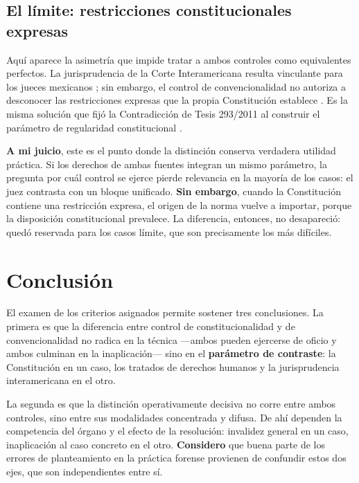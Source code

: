 \documentclass[
  spanish,
  letterpaper, oneside
]{article}
\begin{document}
\subsection{El límite: restricciones constitucionales expresas}

Aquí aparece la asimetría que impide tratar a ambos controles como equivalentes
perfectos. La jurisprudencia de la Corte Interamericana resulta vinculante para los
jueces mexicanos \citep{scjnTesis2005942}; sin embargo, el control de
convencionalidad no autoriza a desconocer las restricciones expresas que la propia
Constitución establece \citep{scjnTesis2006165}. Es la misma solución que fijó la
Contradicción de Tesis 293/2011 al construir el parámetro de regularidad
constitucional \citep{scjnTesis2006224, scjnIijCT293y2017}.

\textbf{A mi juicio}, este es el punto donde la distinción conserva verdadera
utilidad práctica. Si los derechos de ambas fuentes integran un mismo parámetro, la
pregunta por cuál control se ejerce pierde relevancia en la mayoría de los casos:
el juez contrasta con un bloque unificado. \textbf{Sin embargo}, cuando la
Constitución contiene una restricción expresa, el origen de la norma vuelve a
importar, porque la disposición constitucional prevalece. La diferencia, entonces,
no desapareció: quedó reservada para los casos límite, que son precisamente los más
difíciles.

\section{Conclusión}

El examen de los criterios asignados permite sostener tres conclusiones. La primera
es que la diferencia entre control de constitucionalidad y de convencionalidad no
radica en la técnica —ambos pueden ejercerse de oficio y ambos culminan en la
inaplicación— sino en el \textbf{parámetro de contraste}: la Constitución en un
caso, los tratados de derechos humanos y la jurisprudencia interamericana en el
otro.

La segunda es que la distinción operativamente decisiva no corre entre ambos
controles, sino entre sus modalidades concentrada y difusa. De ahí dependen la
competencia del órgano y el efecto de la resolución: invalidez general en un caso,
inaplicación al caso concreto en el otro. \textbf{Considero} que buena parte de los
errores de planteamiento en la práctica forense provienen de confundir estos dos
ejes, que son independientes entre sí.
\end{document}
